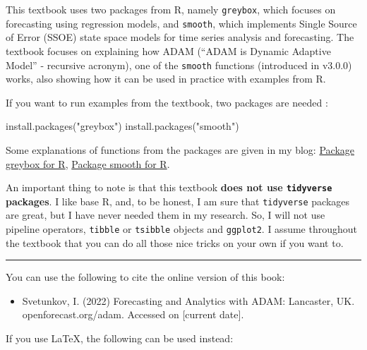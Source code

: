 \documentclass[
]{book}
\newenvironment{Shaded}{\begin{snugshade}}{\end{snugshade}}
\newcommand{\FunctionTok}[1]{\textcolor[rgb]{0.00,0.00,0.00}{#1}}
\newcommand{\NormalTok}[1]{#1}
\newcommand{\StringTok}[1]{\textcolor[rgb]{0.31,0.60,0.02}{#1}}
\providecommand{\tightlist}{%
  \setlength{\itemsep}{0pt}\setlength{\parskip}{0pt}}
\theoremstyle{definition}
\theoremstyle{definition}
\theoremstyle{definition}
\theoremstyle{definition}
\theoremstyle{remark}
\begin{document}
This textbook uses two packages from R, namely \texttt{greybox}, which focuses on forecasting using regression models, and \texttt{smooth}, which implements Single Source of Error (SSOE) state space models for time series analysis and forecasting. The textbook focuses on explaining how ADAM (``ADAM is Dynamic Adaptive Model'' - recursive acronym), one of the \texttt{smooth} functions (introduced in v3.0.0) works, also showing how it can be used in practice with examples from R.

If you want to run examples from the textbook, two packages are needed \citep{R-greybox, R-smooth}:

\begin{Shaded}
\begin{Highlighting}[]
\FunctionTok{install.packages}\NormalTok{(}\StringTok{"greybox"}\NormalTok{)}
\FunctionTok{install.packages}\NormalTok{(}\StringTok{"smooth"}\NormalTok{)}
\end{Highlighting}
\end{Shaded}

Some explanations of functions from the packages are given in my blog: \href{https://forecasting.svetunkov.ru/en/category/r-en/greybox/}{Package greybox for R}, \href{https://forecasting.svetunkov.ru/en/category/r-en/smooth/}{Package smooth for R}.

An important thing to note is that this textbook \textbf{does not use \texttt{tidyverse} packages}. I like base R, and, to be honest, I am sure that \texttt{tidyverse} packages are great, but I have never needed them in my research. So, I will not use pipeline operators, \texttt{tibble} or \texttt{tsibble} objects and \texttt{ggplot2}. I assume throughout the textbook that you can do all those nice tricks on your own if you want to.

\begin{center}\rule{0.5\linewidth}{0.5pt}\end{center}

You can use the following to cite the online version of this book:

\begin{itemize}
\tightlist
\item
  Svetunkov, I. (2022) Forecasting and Analytics with ADAM: Lancaster, UK. openforecast.org/adam. Accessed on {[}current date{]}.
\end{itemize}

If you use LaTeX, the following can be used instead:
\end{document}
